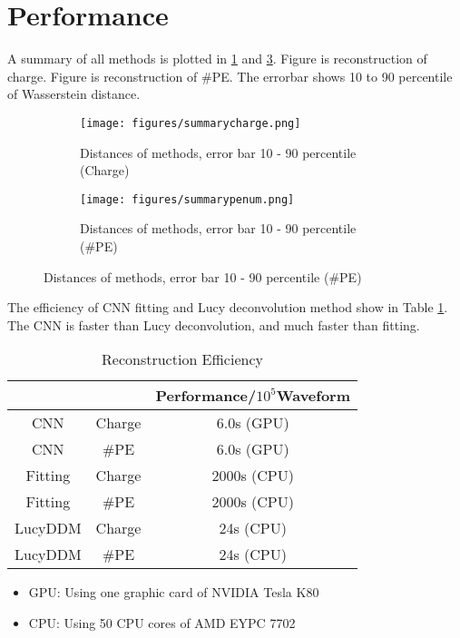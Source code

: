 \section{Performance} %
A summary of all methods is plotted in \ref{fig:chargesummary} and \ref{fig:penumsummary}. Figure \label{fig:chargesummary} is reconstruction of charge. Figure \label{fig:penumsummary} is reconstruction of \#PE. The errorbar shows 10 to 90 percentile of Wasserstein distance. 

\begin{figure}[H]
\begin{minipage}{.5\textwidth}
\begin{figure}[H]
    \centering
    \caption{Distances of methods, error bar 10 - 90 percentile (Charge)}
    \texttt{[image: figures/summarycharge.png]}
    \label{fig:chargesummary}
\end{figure}
\end{minipage}
\begin{minipage}{.5\textwidth}
\begin{figure}[H]
    \centering
    \caption{Distances of methods, error bar 10 - 90 percentile (\#PE)}
    \texttt{[image: figures/summarypenum.png]}
    \label{fig:penumsummary}
\end{figure}
\end{minipage}
\end{figure}

The efficiency of CNN fitting and Lucy deconvolution method show in Table \ref{fig:efficiency}. The CNN is faster than Lucy deconvolution, and much faster than fitting.  

\begin{table}[H]
    \centering
    \caption{Reconstruction Efficiency}
    \begin{tabular}{c|c|c}
        \hline
        &  & Performance/$10^{5}$Waveform \\
        \hline
        CNN & Charge & 6.0s (GPU) \\
        \hline
        CNN & \#PE & 6.0s (GPU)\\
        \hline
        Fitting & Charge & 2000s (CPU) \\
        \hline
        Fitting & \#PE & 2000s (CPU) \\
        \hline
        LucyDDM & Charge & 24s (CPU) \\
        \hline
        LucyDDM & \#PE & 24s (CPU) \\
        \hline
    \end{tabular}
    \label{fig:efficiency}
\end{table}
\hspace{4mm}
\begin{center}
\begin{itemize}
    \item GPU: Using one graphic card of NVIDIA Tesla K80
    \item CPU: Using 50 CPU cores of AMD EYPC 7702
\end{itemize}
\end{center}

